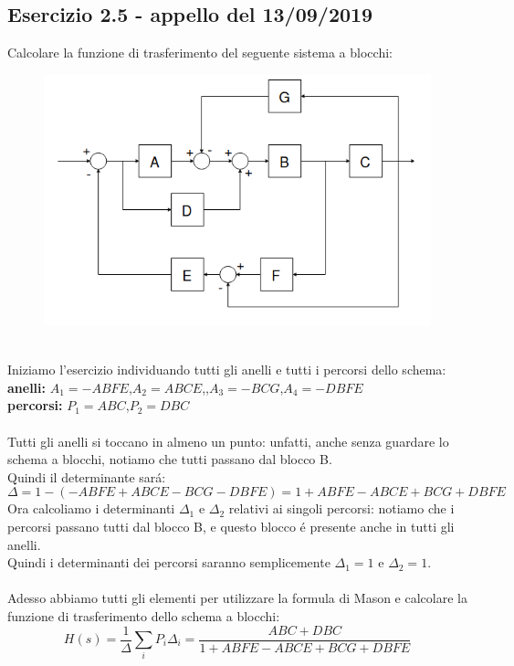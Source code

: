 \documentclass[12pt,a4paper]{article}
\begin{document}
	\subsection*{Esercizio 2.5 - appello del 13/09/2019} Calcolare la funzione di trasferimento del seguente sistema a blocchi:
	\begin{figure}[h!]
		\centering
		\includegraphics[scale=0.5]{./images/schema25.png}
	\end{figure}
	\\
	Iniziamo l'esercizio individuando tutti gli anelli e tutti i percorsi dello schema:
	\textbf{anelli:} $A_1 = -ABFE$,\quad$A_2 = ABCE$,\quad,$A_3=-BCG$,\quad$A_4 = -DBFE$\\
	\textbf{percorsi:} $P_1 = ABC$,\quad$P_2=DBC$\\ \\
	Tutti gli anelli si toccano in almeno un punto: unfatti, anche senza guardare lo schema a blocchi, notiamo che tutti passano dal blocco B.\\
	Quindi il determinante sar\'a:
	\[
		\Delta = 1-(-ABFE+ABCE-BCG-DBFE) = 1+ABFE-ABCE+BCG+DBFE
	\]
	Ora calcoliamo i determinanti $\Delta_1$ e $\Delta_2$ relativi ai singoli percorsi: notiamo che i percorsi passano tutti dal blocco B, e questo blocco \'e presente anche in tutti gli anelli. \\Quindi i determinanti dei percorsi saranno semplicemente $\Delta_1 = 1$ e $\Delta_2 = 1$.\\ \\
	Adesso abbiamo tutti gli elementi per utilizzare la formula di Mason e calcolare la funzione  di trasferimento dello schema a blocchi:
	\[
		H(s) = \frac{1}{\Delta}\sum_i P_i \Delta_i = \frac{ABC + DBC}{1+ABFE - ABCE + BCG + DBFE}
	\]
	\newpage
\end{document}
